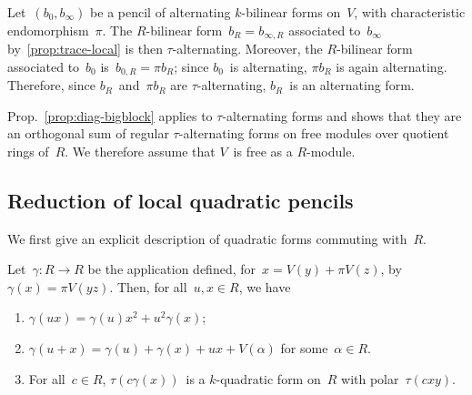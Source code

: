 \documentclass{lms}
\begin{document}
Let~$(b_0, b_{∞})$ be a pencil of alternating $k$-bilinear forms on~$V$,
with characteristic endomorphism~$π$. The $R$-bilinear form~$b_R = b_{∞,
R}$ associated to~$b_{∞}$ by~\ref{prop:trace-local} is then
$τ$-alternating. Moreover, the $R$-bilinear form associated to~$b_{0}$
is~$b_{0, R} = π b_R$; since $b_{0}$~is alternating, $π b_R$ is again
alternating. Therefore, since $b_R$~and~$π b_R$ are $τ$-alternating,
$b_R$~is an alternating form.

Prop.~\ref{prop:diag-bigblock} applies to $τ$-alternating forms and shows
that they are an orthogonal sum of regular $τ$-alternating forms on free
modules over quotient rings of~$R$. We therefore assume that $V$~is free
as a $R$-module.

\subsection{Reduction of local quadratic pencils}

We first give an explicit description of quadratic forms commuting
with~$R$.

\begin{lem}\label{lem:gamma-polar}
Let~$γ: R → R$ be the application defined, for~$x = V(y) + π V(z)$,
by~$γ(x) = π V(yz)$. Then, for all~$u, x ∈ R$, we have
\begin{enumerate}
\item $γ(ux) = γ(u) x^2 + u^2 γ(x)$;
\item $γ(u+x) = γ(u) + γ(x) + ux + V(α)$ for some~$α ∈ R$.
\item For all~$c ∈ R$, $τ(c γ (x))$~is a $k$-quadratic form on~$R$
with polar~$τ(c x y)$.
\end{enumerate}
\end{lem}
\end{document}
